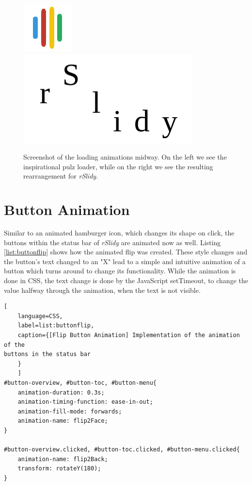 \begin{figure}[tp]
	\centering
	\includegraphics[width = .25\textwidth]{images/pulzLoad.png}
	\includegraphics[width = .5\textwidth]{images/loading.png}	
	\caption[Loader]{
		Screenshot of the loading animations midway. On the left we see 
the inspirational pulz loader, while on the right we see the resulting 
rearrangement for \textit{rSlidy}.
	}
	\label{fig:loading}
\end{figure}


\section{Button Animation} %
\label{sec:button_animation}

Similar to an animated hamburger icon, which changes its shape on click, the 
buttons within the status bar of \textit{rSlidy} are animated now as well. 
Listing \ref{list:buttonflip} shows how the animated flip was created. These 
style changes and the button's text changed to an "X" lead to a simple and 
intuitive animation of a button which turns around to change its functionality. 
While the animation is done in CSS, the text change is done by the JavaScript 
setTimeout, to change the value halfway through the animation, when the text is 
not visible.
\begin{minipage}{\linewidth}
	\begin{lstlisting}[
	language=CSS,
	label=list:buttonflip,
	caption={[Flip Button Animation] Implementation of the animation of the 
buttons in the status bar
	}
	]
#button-overview, #button-toc, #button-menu{ 
	animation-duration: 0.3s; 
	animation-timing-function: ease-in-out;
	animation-fill-mode: forwards;
	animation-name: flip2Face;
}

#button-overview.clicked, #button-toc.clicked, #button-menu.clicked{
	animation-name: flip2Back; 
	transform: rotateY(180);
}
	\end{lstlisting}
\end{minipage}

